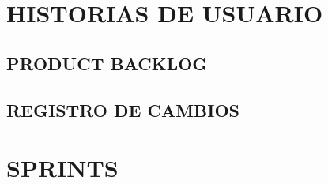\documentclass[12pt,a4paper,openright]{book}
\begin{document}
\chapter{HISTORIAS DE USUARIO}
\section{PRODUCT BACKLOG}

\section{REGISTRO DE CAMBIOS}


\chapter{SPRINTS}






\end{document}
